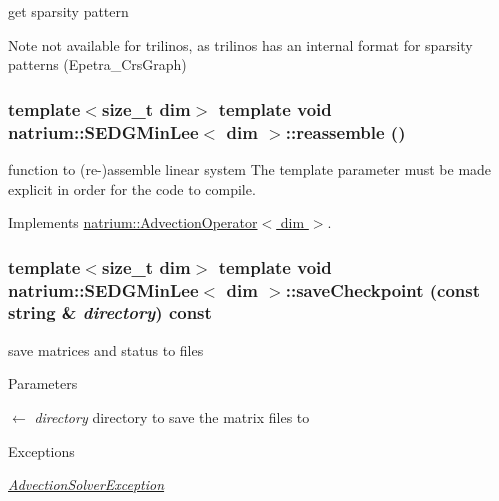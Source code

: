 get sparsity pattern \begin{DoxyNote}{Note}
not available for trilinos, as trilinos has an internal format for sparsity patterns (Epetra\_\-CrsGraph) 
\end{DoxyNote}
\hypertarget{classnatrium_1_1SEDGMinLee_a5fa8b34df3c3bdd9f492a1e555effbe4}{
\subsubsection[{reassemble}]{\setlength{\rightskip}{0pt plus 5cm}template$<$size\_\-t dim$>$ template void {\bf natrium::SEDGMinLee}$<$ dim $>$::reassemble ()}}
\label{classnatrium_1_1SEDGMinLee_a5fa8b34df3c3bdd9f492a1e555effbe4}


function to (re-\/)assemble linear system The template parameter must be made explicit in order for the code to compile. 

Implements \hyperlink{classnatrium_1_1AdvectionOperator_a89c25c3dae9a1e5973cd89fab8c2c052}{natrium::AdvectionOperator$<$ dim $>$}.\hypertarget{classnatrium_1_1SEDGMinLee_ab3cf80e18230ee7f08f4ed9883b9dadd}{
\subsubsection[{saveCheckpoint}]{\setlength{\rightskip}{0pt plus 5cm}template$<$size\_\-t dim$>$ template void {\bf natrium::SEDGMinLee}$<$ dim $>$::saveCheckpoint (const string \& {\em directory}) const}}
\label{classnatrium_1_1SEDGMinLee_ab3cf80e18230ee7f08f4ed9883b9dadd}


save matrices and status to files 
\begin{DoxyParams}{Parameters}
\item[\mbox{$\leftarrow$} {\em directory}]directory to save the matrix files to \end{DoxyParams}

\begin{DoxyExceptions}{Exceptions}
\item[{\em \hyperlink{classnatrium_1_1AdvectionSolverException}{AdvectionSolverException}}]\end{DoxyExceptions}


